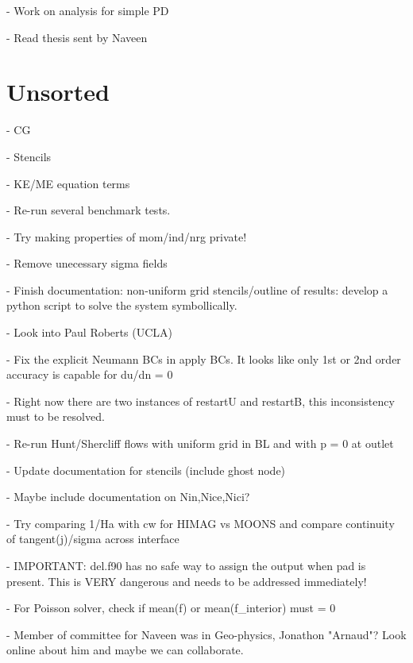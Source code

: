 \documentclass[11pt]{article}
\begin{document}
- Work on analysis for simple PD

- Read thesis sent by Naveen

\section{Unsorted}

- CG

- Stencils

- KE/ME equation terms

- Re-run several benchmark tests.

- Try making properties of mom/ind/nrg private!

- Remove unecessary sigma fields

- Finish documentation: non-uniform grid stencils/outline of results: develop a python script to solve the system symbollically.

- Look into Paul Roberts (UCLA)

- Fix the explicit Neumann BCs in apply BCs. It looks like only 1st or 2nd order accuracy is capable for du/dn = 0

- Right now there are two instances of restartU and restartB, this inconsistency must to be resolved.

- Re-run Hunt/Shercliff flows with uniform grid in BL and with p = 0 at outlet

- Update documentation for stencils (include ghost node)

- Maybe include documentation on Nin,Nice,Nici?

- Try comparing 1/Ha with cw for HIMAG vs MOONS and compare continuity of tangent(j)/sigma across interface

- IMPORTANT: del.f90 has no safe way to assign the output when pad is present. This is VERY dangerous and needs to be addressed immediately!

- For Poisson solver, check if mean(f) or mean(f\_interior) must = 0

- Member of committee for Naveen was in Geo-physics, Jonathon "Arnaud"? Look online about him and maybe we can collaborate.
\end{document}
